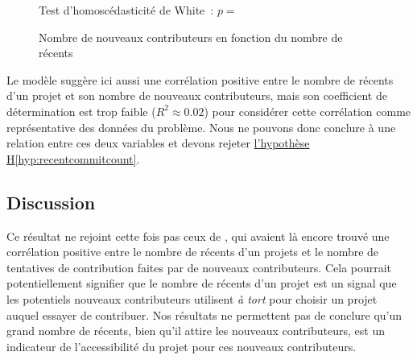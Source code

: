 \begin{figure}[ht]
    

    Test d'homoscédasticité de White : $p = $

    \caption{Nombre de nouveaux contributeurs en fonction du nombre de  récents}
    \label{fig:commitCount}
\end{figure}

Le modèle suggère ici aussi une corrélation positive entre le nombre de  récents d'un projet et
son nombre de nouveaux contributeurs, mais son coefficient de détermination est trop faible ($R^2 \approx
0.02$) pour considérer cette corrélation comme représentative des données du problème. Nous ne pouvons donc
conclure à une relation entre ces deux variables et devons rejeter
\hyperref[hyp:recentcommitcount]{l'hypothèse H\ref*{hyp:recentcommitcount}}.

\subsection{Discussion}

Ce résultat ne rejoint cette fois pas ceux de \textcite[p.~13,16]{signals-2019}, qui avaient là encore trouvé
une corrélation positive entre le nombre de  récents d'un projets et le nombre de tentatives de
contribution faites par de nouveaux contributeurs. Cela pourrait potentiellement signifier que le nombre de
 récents d'un projet est un signal que les potentiels nouveaux contributeurs utilisent \emph{à
tort} pour choisir un projet auquel essayer de contribuer. Nos résultats ne permettent pas de conclure qu'un
grand nombre de  récents, bien qu'il attire les nouveaux contributeurs, est un indicateur de
l'accessibilité du projet pour ces nouveaux contributeurs.
